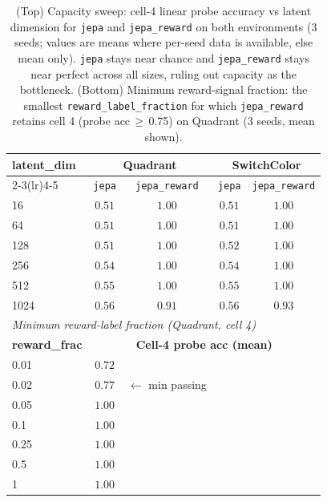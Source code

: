 \begin{table}[t]
\centering
\caption{(Top) Capacity sweep: cell-4 linear probe accuracy vs latent dimension for \texttt{jepa} and \texttt{jepa\_reward} on both environments (3 seeds; values are means where per-seed data is available, else mean only). \texttt{jepa} stays near chance and \texttt{jepa\_reward} stays near perfect across all sizes, ruling out capacity as the bottleneck. (Bottom) Minimum reward-signal fraction: the smallest \texttt{reward\_label\_fraction} for which \texttt{jepa\_reward} retains cell 4 (probe acc\,$\geq$\,0.75) on Quadrant (3 seeds, mean shown).}
\label{tab:capacity_minreward}
\begin{tabular}{lcccc}
\toprule
\textbf{latent\_dim} & \multicolumn{2}{c}{\textbf{Quadrant}} & \multicolumn{2}{c}{\textbf{SwitchColor}} \\
\cmidrule(lr){2-3}\cmidrule(lr){4-5}
 & \texttt{jepa} & \texttt{jepa\_reward} & \texttt{jepa} & \texttt{jepa\_reward} \\
\midrule
  16 & $0.51$ & $1.00$ & $0.51$ & $1.00$ \\
  64 & $0.51$ & $1.00$ & $0.51$ & $1.00$ \\
  128 & $0.51$ & $1.00$ & $0.52$ & $1.00$ \\
  256 & $0.54$ & $1.00$ & $0.54$ & $1.00$ \\
  512 & $0.55$ & $1.00$ & $0.55$ & $1.00$ \\
  1024 & $0.56$ & $0.91$ & $0.56$ & $0.93$ \\
\midrule
\multicolumn{5}{l}{\textit{Minimum reward-label fraction (Quadrant, cell 4)}} \\
\midrule
\textbf{reward\_frac} & \multicolumn{4}{c}{\textbf{Cell-4 probe acc (mean)}} \\
\midrule
  0.01 & $0.72$ &  \\
  0.02 & $0.77$ &  $\leftarrow$ min passing \\
  0.05 & $1.00$ &  \\
  0.1 & $1.00$ &  \\
  0.25 & $1.00$ &  \\
  0.5 & $1.00$ &  \\
  1 & $1.00$ &  \\
\bottomrule
\end{tabular}
\end{table}